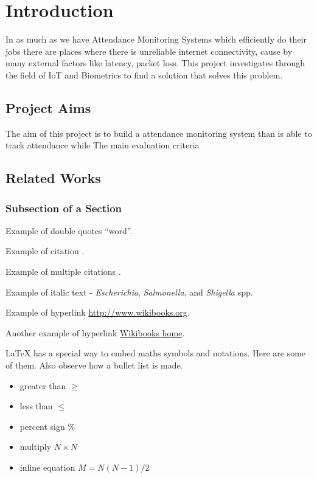 \chapter{Introduction}

In as much as we have Attendance Monitoring Systems which efficiently do their jobs there are places where there is unreliable internet connectivity, cause by many external factors like latency, packet loss. This project investigates through the field of IoT and Biometrics to find a solution that solves this problem.


\section{Project Aims}

The aim of this project is to build a attendance monitoring system than is able to track attendance while 
The main evaluation criteria

\section{Related Works} 



\subsection{Subsection of a Section}

Example of double quotes ``word''. 

Example of citation \citep{altschul1997gapped}.  

Example of multiple citations \citep{altschul1997gapped,baker2007novel}. 


Example of italic text - {\it Escherichia}, {\it Salmonella}, and {\it Shigella} spp. 

Example of hyperlink \url{http://www.wikibooks.org}. 

Another example of hyperlink \href{http://www.wikibooks.org}{Wikibooks home}. 

LaTeX{} has a special way to embed maths symbols and notations. Here are some of them. Also observe how a bullet list is made.

\begin{itemize}\itemsep0pt \parskip0pt 
\item greater than $\ge$
\item less than $\le$
\item percent sign \%
\item multiply $N\times N$
\item inline equation $M = N(N-1)/2$
\end{itemize}

